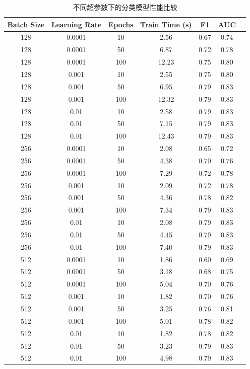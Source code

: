 \documentclass[12pt]{article}
\begin{document}
\begin{table}[htbp]
\centering
\caption{不同超参数下的分类模型性能比较}
\begin{tabular}{ccccccc}
\hline
\textbf{Batch Size} & \textbf{Learning Rate} & \textbf{Epochs} & \textbf{Train Time (s)} & \textbf{F1} & \textbf{AUC} \\
\hline
128 & 0.0001 & 10 & 2.56 & 0.67 & 0.74 \\
128 & 0.0001 & 50 & 6.87 & 0.72 & 0.78 \\
128 & 0.0001 & 100 & 12.23 & 0.75 & 0.80 \\
128 & 0.001 & 10 & 2.55 & 0.75 & 0.80 \\
128 & 0.001 & 50 & 6.95 & 0.79 & 0.83 \\
128 & 0.001 & 100 & 12.32 & 0.79 & 0.83 \\
128 & 0.01 & 10 & 2.58 & 0.79 & 0.83 \\
128 & 0.01 & 50 & 7.15 & 0.79 & 0.83 \\
128 & 0.01 & 100 & 12.43 & 0.79 & 0.83 \\
256 & 0.0001 & 10 & 2.08 & 0.65 & 0.72 \\
256 & 0.0001 & 50 & 4.38 & 0.70 & 0.76 \\
256 & 0.0001 & 100 & 7.29 & 0.72 & 0.78 \\
256 & 0.001 & 10 & 2.09 & 0.72 & 0.78 \\
256 & 0.001 & 50 & 4.36 & 0.78 & 0.82 \\
256 & 0.001 & 100 & 7.34 & 0.79 & 0.83 \\
256 & 0.01 & 10 & 2.08 & 0.79 & 0.83 \\
256 & 0.01 & 50 & 4.45 & 0.79 & 0.83 \\
256 & 0.01 & 100 & 7.40 & 0.79 & 0.83 \\
512 & 0.0001 & 10 & 1.86 & 0.60 & 0.69 \\
512 & 0.0001 & 50 & 3.18 & 0.68 & 0.75 \\
512 & 0.0001 & 100 & 5.04 & 0.70 & 0.76 \\
512 & 0.001 & 10 & 1.82 & 0.70 & 0.76 \\
512 & 0.001 & 50 & 3.25 & 0.76 & 0.81 \\
512 & 0.001 & 100 & 5.01 & 0.78 & 0.82 \\
512 & 0.01 & 10 & 1.82 & 0.78 & 0.82 \\
512 & 0.01 & 50 & 3.23 & 0.79 & 0.83 \\
512 & 0.01 & 100 & 4.98 & 0.79 & 0.83 \\
\hline
\end{tabular}
\label{tab:classification_results}
\end{table}
\end{document}

